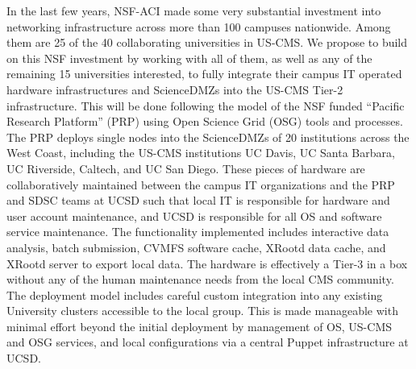 \documentclass[11pt,a4paper]{article}
\begin{document}

In the last few years, NSF-ACI made some very substantial investment
into networking infrastructure across more than 100 campuses
nationwide. Among them are 25 of the 40 collaborating universities in
US-CMS. We propose to build on this NSF investment by working with all
of them, as well as any of the remaining 15 universities interested,
to fully integrate their campus IT operated hardware infrastructures
and ScienceDMZs into the US-CMS Tier-2 infrastructure. This will be
done following the model of the NSF funded ``Pacific Research
Platform'' (PRP) using Open Science Grid (OSG) tools and processes.
The PRP deploys single nodes into the ScienceDMZs of 20 institutions
across the West Coast, including the US-CMS institutions UC Davis, UC
Santa Barbara, UC Riverside, Caltech, and UC San Diego. These pieces
of hardware are collaboratively maintained between the campus IT
organizations and the PRP and SDSC teams at UCSD such that local IT is
responsible for hardware and user account maintenance, and UCSD is
responsible for all OS and software service maintenance.  The
functionality implemented includes interactive data analysis, batch
submission, CVMFS software cache, XRootd data cache, and XRootd server
to export local data. The hardware is effectively a Tier-3 in a box
without any of the human maintenance needs from the local CMS
community. The deployment model includes careful custom integration
into any existing University clusters accessible to the local
group. This is made manageable with minimal effort beyond the initial
deployment by management of OS, US-CMS and OSG services, and local
configurations via a central Puppet infrastructure at UCSD.
\end{document}
